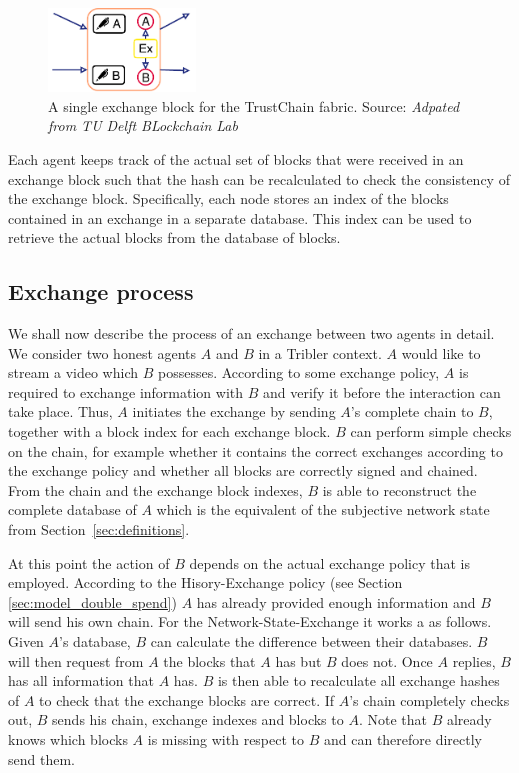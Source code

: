 \begin{figure}
    \centering
    \includegraphics[width=0.35\textwidth]{images/exchange_block.pdf}
    \caption{A single exchange block for the TrustChain fabric. Source: \textit{Adpated from TU Delft BLockchain Lab}}
    \label{fig:exchange_block}
\end{figure}

Each agent keeps track of the actual set of blocks that were received in an exchange block such that 
the hash can be recalculated to check the consistency of the exchange block. Specifically, each 
node stores an index of the blocks contained in an exchange in a separate database. This index can be 
used to retrieve the actual blocks from the database of blocks. 

\subsection{Exchange process}
We shall now describe the process of an exchange between two agents in detail. We consider two honest 
agents $A$ and $B$ in a Tribler context. $A$ would like to stream a video which $B$ possesses. According
to some exchange policy, $A$ is required to exchange information with $B$ and verify it before the 
interaction can take place. Thus, $A$ initiates the exchange by sending $A$'s complete chain to $B$,
together with a block index for each exchange block.
$B$ can perform simple checks on the chain, for example whether it contains the correct exchanges 
according to the exchange policy and whether all blocks are correctly signed and chained. From the 
chain and the exchange block indexes, $B$ is able to reconstruct the complete database of $A$ which 
is the equivalent of the subjective network state from Section~\ref{sec:definitions}. 

At this point the action of $B$ depends on the actual exchange policy that is employed. According to
the Hisory-Exchange policy (see Section \ref{sec:model_double_spend}) $A$ has already provided 
enough information and $B$ will send his own chain. For the Network-State-Exchange it works a as
follows. Given $A$'s database, $B$ can calculate the difference between their databases. $B$ will 
then request from $A$ the blocks that $A$ has but $B$ does not. Once $A$ replies, $B$ has all 
information that $A$ has. $B$ is then able to recalculate all exchange hashes of $A$ to check that 
the exchange blocks are correct. If $A$'s chain completely checks out, $B$ sends his chain, exchange
indexes and blocks to $A$. Note that $B$ already knows which blocks $A$ is missing with respect to 
$B$ and can therefore directly send them. 

